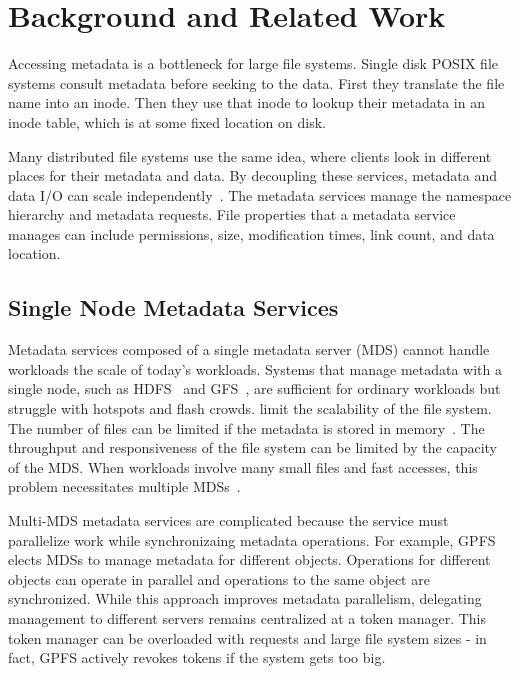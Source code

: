 \chapter{Background and Related Work}
\label{related-work}
Accessing metadata is a bottleneck for large file systems. Single disk POSIX file systems consult metadata before seeking to the data. First they translate the file name into an inode. Then they use that inode to lookup their metadata in an inode table, which is at some fixed location on disk. 

Many distributed file systems use the same idea, where clients look in different places for their metadata and data. By decoupling these services, metadata and data I/O can scale independently~\cite{alam:pdsw2011-metadata-scaling, ghemawat:sosp2003-gfs, hildebrand:msst2005-pnfs,website:lustre,weil:osdi2006-ceph,welch:fast2008-panasas,xing:sc2009-skyfs}. The metadata services manage the namespace hierarchy and metadata requests. File properties that a metadata service manages can include permissions, size, modification times, link count, and data location. 

\section{Single Node Metadata Services}
\label{related-work:single-node-metadata-services}
Metadata services composed of a single metadata server (MDS) cannot handle workloads the scale of today's workloads. 
Systems that manage metadata with a single node, such as HDFS~\cite{shvachko:login2012-hdfs-scalability} and GFS~\cite{ghemawat:sosp2003-gfs}, are sufficient for ordinary workloads but struggle with hotspots and flash crowds. limit the scalability of the file system. The number of files can be limited if the metadata is stored in memory~\cite{ghemawat:sosp2003-gfs, weil:osdi2006-ceph,shvachko:login2012-hdfs-scalability}. The throughput and responsiveness of the file system can be limited by the capacity of the MDS. When workloads involve many small files and fast accesses, this problem necessitates multiple MDSs~\cite{mckusick:acm2010-gfs-evolution}. 

Multi-MDS metadata services are complicated because the service must parallelize work while synchronizaing metadata operations.  For example, GPFS~\cite{schmuck:fast2002-gpfs} elects MDSs to manage metadata for different objects. Operations for different objects can operate in parallel and operations to the same object are synchronized. While this approach improves metadata parallelism, delegating management to different servers remains centralized at a token manager. This token manager can be overloaded with requests and large file system sizes - in fact, GPFS actively revokes tokens if the system gets too big.

